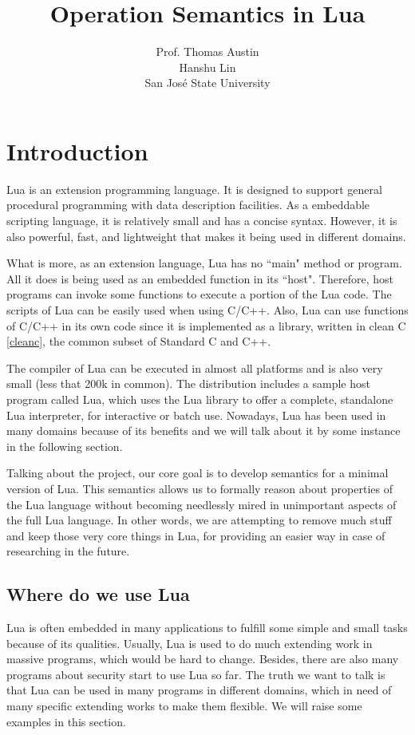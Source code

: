 \documentclass{article}
\title{ Operation Semantics in Lua}
\author{
  Prof. Thomas Austin\\
  Hanshu Lin \\
  San Jos\'{e} State University \\
  }
\date{}
\begin{document}
\maketitle

\section{Introduction}
Lua is an extension programming language. It is designed to support general procedural programming with data description facilities. As a embeddable scripting language, it is relatively small and has a concise syntax. However, it is also powerful, fast, and lightweight that makes it being used in different domains.

What is more, as an extension language, Lua has no ``main" method or program. All it does is being used as an embedded function in its ``host". Therefore, host programs can invoke some functions to execute a portion of the Lua code. The scripts of Lua can be easily used when using C/C++. Also, Lua can use functions of C/C++ in its own code since it is implemented as a library, written in clean C \ref{cleanc}, the common subset of Standard C and C++.

The compiler of Lua can be executed in almost all platforms and is also very small (less that 200k in common). The distribution includes a sample host program called Lua, which uses the Lua library to offer a complete, standalone Lua interpreter, for interactive or batch use. Nowadays, Lua has been used in many domains because of its benefits and we will talk about it by some instance in the following section.

Talking about the project, our core goal is to develop semantics for a minimal version of Lua. This semantics allows us to formally reason about properties of the Lua language without becoming needlessly mired in unimportant aspects of the full Lua language. In other words, we are attempting to remove much stuff and keep those very core things in Lua, for providing an easier way in case of researching in the future.

\subsection{Where do we use Lua}
Lua is often embedded in many applications to fulfill some simple and small tasks because of its qualities. Usually, Lua is used to do much extending work in massive programs, which would be hard to change. Besides, there are also many programs about security start to use Lua so far. The truth we want to talk is that Lua can be used in many programs in different domains, which in need of many specific extending works to make them flexible. We will raise some examples in this section.
\end{document}
